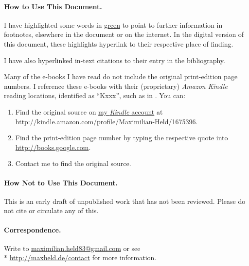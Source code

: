 \paragraph{How to Use This Document.}
I have highlighted some words in \href{chap:how2}{green} to point to further information in footnotes, elsewhere in the document or on the internet.
In the digital version of this document, these highlights hyperlink to their respective place of finding.

I have also hyperlinked in-text citations to their entry in the bibliography.

Many of the e-books I have read do not include the original print-edition page numbers.
I reference these e-books with their (proprietary) \emph{Amazon Kindle \circledR} reading locations, identified as ``Kxxx'', such as in \citet[K50]{McCaffery2002}.
You can:

\begin{enumerate}
	\item Find the original source on \href{http://kindle.amazon.com/profile/Maximilian-Held/1675396}{my \emph{Kindle \circledR} account} at\\ \url{http://kindle.amazon.com/profile/Maximilian-Held/1675396}.

	\item Find the print-edition page number by typing the respective quote into \url{http://books.google.com}.

	\item Contact me to find the original source.
\end{enumerate}

\paragraph{How Not to Use This Document.}
This is an early draft of unpublished work that has not been reviewed. Please do not cite or circulate any of this.

\paragraph{Correspondence.}
Write to \href{mailto:maximilian.held83@gmail.com}{maximilian.held83@gmail.com} or see \\* \url{http://maxheld.de/contact} for more information.